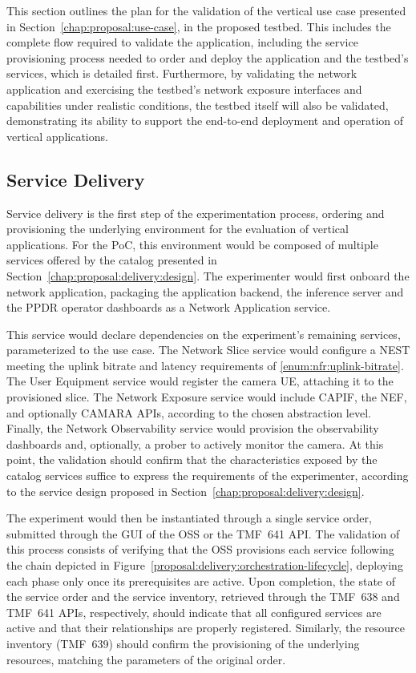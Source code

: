 This section outlines the plan for the validation of the vertical use case presented in Section~\ref{chap:proposal:use-case}, in the proposed testbed. This includes the complete flow required to validate the application, including the service provisioning process needed to order and deploy the application and the testbed's services, which is detailed first. Furthermore, by validating the network application and exercising the testbed's network exposure interfaces and capabilities under realistic conditions, the testbed itself will also be validated, demonstrating its ability to support the end-to-end deployment and operation of vertical applications.

\subsection{Service Delivery}
\label{chap:proposal:validation:delivery}

Service delivery is the first step of the experimentation process, ordering and provisioning the underlying environment for the evaluation of vertical applications. For the \acs{PoC}, this environment would be composed of multiple services offered by the catalog presented in Section~\ref{chap:proposal:delivery:design}. The experimenter would first onboard the network application, packaging the application backend, the inference server and the \acs{PPDR} operator dashboards as a Network Application service.

This service would declare dependencies on the experiment's remaining services, parameterized to the use case. The Network Slice service would configure a \acs{NEST} meeting the uplink bitrate and latency requirements of \ref{enum:nfr:uplink-bitrate}. The User Equipment service would register the camera \acs{UE}, attaching it to the provisioned slice. The Network Exposure service would include \acs{CAPIF}, the \acs{NEF}, and optionally CAMARA \acsp{API}, according to the chosen abstraction level. Finally, the Network Observability service would provision the observability dashboards and, optionally, a prober to actively monitor the camera. At this point, the validation should confirm that the characteristics exposed by the catalog services suffice to express the requirements of the experimenter, according to the service design proposed in Section~\ref{chap:proposal:delivery:design}.

The experiment would then be instantiated through a single service order, submitted through the \acs{GUI} of the \acs{OSS} or the \acs{TMF}~641 \acs{API}. The validation of this process consists of verifying that the \acs{OSS} provisions each service following the chain depicted in Figure~\ref{proposal:delivery:orchestration-lifecycle}, deploying each phase only once its prerequisites are active. Upon completion, the state of the service order and the service inventory, retrieved through the \acs{TMF}~638 and \acs{TMF}~641 \acsp{API}, respectively, should indicate that all configured services are active and that their relationships are properly registered. Similarly, the resource inventory (\acs{TMF}~639) should confirm the provisioning of the underlying resources, matching the parameters of the original order.

